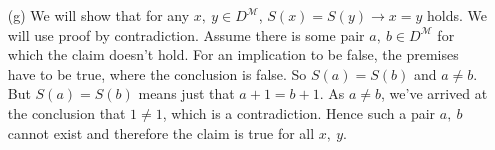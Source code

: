 \begin{enumerate}


    \item[(g)] %
    We will show that for any $x,\ y \in D^\mathcal{M}$, $S(x) = S(y)
    \rightarrow x = y$ holds. We will use proof by
    contradiction. Assume there is some pair $a,\ b \in D^\mathcal{M}$
    for which the claim doesn't hold. For an implication to be false,
    the premises have to be true, where the conclusion is false. So
    $S(a) = S(b)$ and $ a \neq b$. But $S(a) = S(b)$ means just that
    $a + 1 = b + 1$. As $a \neq b$, we've arrived at the conclusion
    that $1 \neq 1$, which is a contradiction. Hence such a pair $a,\
    b$ cannot exist and therefore the claim is true for all $x,\ y$.
\end{enumerate}

